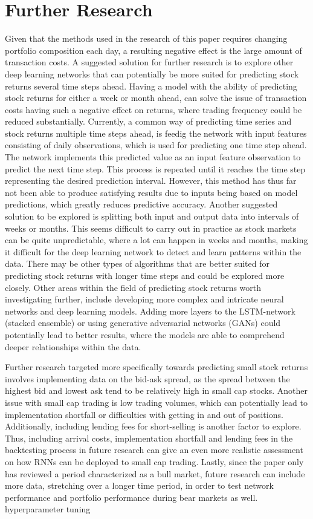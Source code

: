 \section{Further Research}
Given that the methods used in the research of this paper requires changing portfolio composition each day, a resulting negative effect is the large amount of transaction costs. A suggested solution for further research is to explore other deep learning networks that can potentially be more suited for predicting stock returns several time steps ahead. Having a model with the ability of predicting stock returns for either a week or month ahead, can solve the issue of transaction costs having such a negative effect on returns, where trading frequency could be reduced substantially. Currently, a common way of predicting time series and stock returns multiple time steps ahead, is feedig the network with input features consisting of daily observations, which is used for predicting one time step ahead. The network implements this predicted value as an input feature observation to predict the next time step. This process is repeated until it reaches the time step representing the desired prediction interval. However, this method has thus far not been able to produce satisfying results due to inputs being based on model predictions, which greatly reduces predictive accuracy. Another suggested solution to be explored is splitting both input and output data into intervals of weeks or months. This seems difficult to carry out in practice as stock markets can be quite unpredictable, where a lot can happen in weeks and months, making it difficult for the deep learning network to detect and learn patterns within the data. There may be other types of algorithms that are better suited for predicting stock returns with longer time steps and could be explored more closely. Other areas within the field of predicting stock returns worth investigating further, include developing more complex and intricate neural networks and deep learning models. Adding more layers to the LSTM-network (stacked ensemble) or using generative adversarial networks (GANs) could potentially lead to better results, where the models are able to comprehend deeper relationships within the data.  

\indent\newline 
Further research targeted more specifically towards predicting small stock returns involves implementing data on the bid-ask spread, as the spread between the highest bid and lowest ask tend to be relatively high in small cap stocks. Another issue with small cap trading is low trading volumes, which can potentially lead to implementation shortfall or difficulties with getting in and out of positions. Additionally, including lending fees for short-selling is another factor to explore. Thus, including arrival costs, implementation shortfall and lending fees in the backtesting process in future research can give an even more realistic assessment on how RNNs can be deployed to small cap trading. Lastly, since the paper only has reviewed a period characterized as a bull market,  future research can include more data, stretching over a longer time period, in order to test network performance and portfolio performance during bear markets as well.   hyperparameter tuning